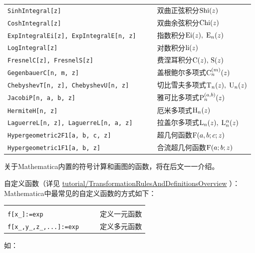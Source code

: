 \documentclass[UTF8,a4paper,10pt]{ctexart}
\begin{document}
\begin{center}
\begin{tabular}{p{9cm}l|lp{5cm}}
\verb-SinhIntegral[z]-                & \qquad & & 双曲正弦积分${\rm Shi} (z)$ \\[-0.20pt]
\verb-CoshIntegral[z]-                & \qquad & & 双曲余弦积分${\rm Chi} (z)$ \\[-0.20pt]
\verb-ExpIntegralEi[z], ExpIntegralE[n, z]-    & \qquad & & 指数积分${\rm Ei} (z), \; {\rm E}_n (z)$ \\[-0.20pt]
\verb-LogIntegral[z]-                 & \qquad & & 对数积分${\rm li} (z)$ \\[-0.20pt]
\verb-FresnelC[z], FresnelS[z]-       & \qquad & & 费涅耳积分${\rm C} (z), \, {\rm S} (z)$\\[-0.20pt]
\verb-GegenbauerC[n, m, z]-           & \qquad & & 盖根鲍尔多项式${\rm C}_n^{(m)} (z)$   \\[-0.20pt]
\verb-ChebyshevT[n, z], ChebyshevU[n, z]-     & \qquad & & 切比雪夫多项式${\rm T}_n (z), \; {\rm U}_n (z)$ \\[-0.20pt]
\verb-JacobiP[n, a, b, z]-           & \qquad & & 雅可比多项式${\rm P}_n^{(a, b)} (z)$    \\[-0.20pt]
\verb-HermiteH[n, z]-                & \qquad & & 厄米多项式${\rm H}_n (z)$            \\[-0.20pt]
\verb-LaguerreL[n, z], LaguerreL[n, a, z]-    & \qquad & & 拉盖尔多项式${\rm L}_n (z), \; {\rm L}_n^{\alpha} (z)$           \\[-0.20pt]
\verb-Hypergeometric2F1[a, b, c, z]- & \qquad & & 超几何函数${\rm F}(a, b; c; z)$         \\[-0.20pt]
\verb-Hypergeometric1F1[a, b, z]-    & \qquad & & 合流超几何函数${\rm F}(a; b; z)$        \\[2pt]
\hline\hline\hline
\end{tabular}
\end{center}

关于Mathematica内置的符号计算和画图的函数，将在后文一一介绍。

自定义函数（详见
\href{http://reference.wolfram.com/language/tutorial/TransformationRulesAndDefinitionsOverview.html}{tutorial/TransformationRulesAndDefinitionsOverview}
）：Mathematica中最常见的自定义函数的方式如下：

\noindent
\begin{center}
\begin{tabular}{p{7cm}l|lp{5cm}}
\hline\hline\hline
& & & \\[-13pt]
\verb+f[x_]:=exp+                    & \qquad & & 定义一元函数 \\[-0.20pt]
\verb-f[x_,y_,z_,...]:=exp-        & \qquad & & 定义多元函数 \\[-0.20pt]
\hline\hline\hline
\end{tabular}
\end{center}
如：
\end{document}
